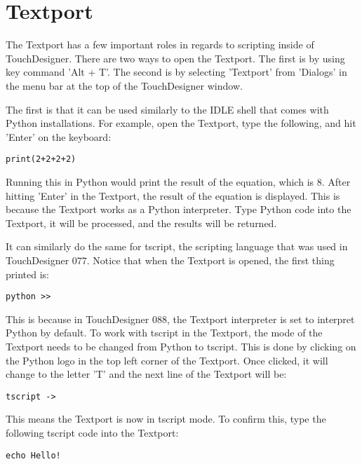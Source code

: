 
\section{Textport}

\begin{fullwidth}
The Textport has a few important roles in regards to scripting inside of TouchDesigner. There are two ways to open the Textport. The first is by using key command 'Alt + T'. The second is by selecting 'Textport' from 'Dialogs' in the menu bar at the top of the TouchDesigner window.

The first is that it can be used similarly to the IDLE shell that comes with Python installations. For example, open the Textport, type the following, and hit 'Enter' on the keyboard:

\begin{lstlisting}
print(2+2+2+2)
\end{lstlisting}

Running this in Python would print the result of the equation, which is 8. After hitting 'Enter' in the Textport, the result of the equation is displayed. This is because the Textport works as a Python interpreter. Type Python code into the Textport, it will be processed, and the results will be returned. 

It can similarly do the same for tscript, the scripting language that was used in TouchDesigner 077. Notice that when the Textport is opened, the first thing printed is: 

\begin{lstlisting}
python >> 
\end{lstlisting}

This is because in TouchDesigner 088, the Textport interpreter is set to interpret Python by default. To work with tscript in the Textport, the mode of the Textport needs to be changed from Python to tscript. This is done by clicking on the Python logo in the top left corner of the Textport. Once clicked, it will change to the letter 'T' and the next line of the Textport will be:

\begin{lstlisting}
tscript -> 
\end{lstlisting}

This means the Textport is now in tscript mode. To confirm this, type the following tscript code into the Textport:

\begin{lstlisting}
echo Hello!
\end{lstlisting}


\end{fullwidth}

